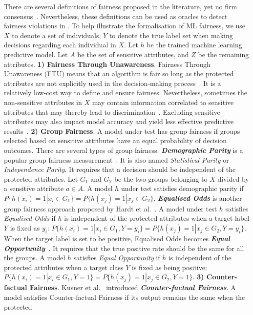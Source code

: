 \label{sec:fairnessdefinitions}
There are several definitions of fairness proposed in the literature, yet no firm consensus~.
Nevertheless, these definitions can be used as oracles to detect fairness violations in \mlt{}.
To help illustrate the formalisation of ML fairness, we use 
$X$ to denote a set of individuals,
$Y$ to denote the true label set when making decisions regarding each individual in $X$.
Let $h$ be the trained machine learning predictive model.
Let $A$ be the set of sensitive attributes, and $Z$ be the remaining attributes.
\noindent \textbf{1) Fairness Through Unawareness}.
Fairness Through Unawareness (FTU) means that an algorithm is fair so long as the protected
attributes are not explicitly used in the decision-making process~.
It is a relatively low-cost way to define and ensure fairness. 
Nevertheless, sometimes the non-sensitive attributes in $X$ may contain
information correlated to sensitive attributes that may thereby lead to discrimination~. 
Excluding sensitive attributes may also impact model accuracy and yield less effective predictive results~.
\noindent \textbf{2) Group Fairness}.
A model under test has group fairness if groups selected based on 
sensitive attributes have an equal probability of decision outcomes.
There are several types of group fairness.
\textbf{\emph{Demographic Parity}} is a popular group fairness measurement~. 
It is also named \emph{Statistical Parity} or \emph{Independence Parity}.
It requires that a decision should be independent of the protected attributes. 
Let $G_1$ and $G_2$ be the two groups belonging to $X$ divided by a sensitive attribute $a\in A$.
A model $h$ under test satisfies demographic parity if $P\{h(x_i)=1|x_i\in G_1\} = P\{h(x_j)=1|x_j \in G_2\}$.
\textbf{\emph{Equalised Odds}} is another group fairness approach proposed by Hardt et al.~.
A model under test $h$ satisfies \emph{Equalised Odds} if $h$ is independent of the protected attributes when a target label $Y$ is fixed as $y_i$:
$P\{h(x_i)=1|x_i\in G_1,Y=y_i\} = P\{h(x_j)=1|x_j \in G_2,Y=y_i\}$.
When the target label is set to be positive, Equalised Odds becomes \textbf{\emph{Equal Opportunity}}~.
It requires that the true positive rate should be the same for all the groups.
A model $h$ satisfies \emph{Equal Opportunity} if $h$ is independent of the protected attributes when a target class $Y$ is fixed as being positive:
$P\{h(x_i)=1|x_i\in G_1,Y=1\} = P\{h(x_j)=1|x_j \in G_2,Y=1\}$.
\noindent \textbf{3) Counter-factual Fairness}.
Kusner et al.~ introduced \textbf{\emph{Counter-factual Fairness}}.
A model satisfies Counter-factual Fairness if its output remains the same when the protected

